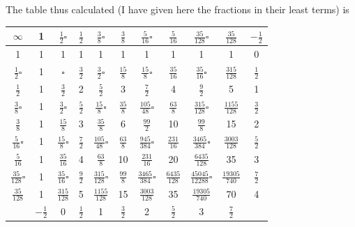 \documentclass[11pt,a4paper]{article}
\begin{document}
\smallskip
The table thus calculated (I have given here the fractions in their least terms) is

\begin{center}
\renewcommand{\arraystretch}{1.3}
\setlength{\tabcolsep}{4pt}
\begin{tabular}{|c|c|c|c|c|c|c|c|c|c|c|}
\hline
$\infty$ & 1 & $\tfrac{1}{2}\square$ & $\tfrac{1}{2}$ & $\tfrac{3}{8}\square$ & $\tfrac{3}{8}$ & $\tfrac{5}{16}\square$ & $\tfrac{5}{16}$ & $\tfrac{35}{128}\square$ & $\tfrac{35}{128}$ & $-\tfrac{1}{2}$\\
\hline
1 & 1 & 1 & 1 & 1 & 1 & 1 & 1 & 1 & 1 & 0\\
\hline
$\tfrac{1}{2}\square$ & 1 & $\square$ & $\tfrac{3}{2}$ & $\tfrac{3}{2}\square$ & $\tfrac{15}{8}$ & $\tfrac{15}{8}\square$ & $\tfrac{35}{16}$ & $\tfrac{35}{16}\square$ & $\tfrac{315}{128}$ & $\tfrac{1}{2}$\\
\hline
$\tfrac{1}{2}$ & 1 & $\tfrac{3}{2}$ & 2 & $\tfrac{5}{2}$ & 3 & $\tfrac{7}{2}$ & 4 & $\tfrac{9}{2}$ & 5 & 1\\
\hline
$\tfrac{3}{8}\square$ & 1 & $\tfrac{3}{2}\square$ & $\tfrac{5}{2}$ & $\tfrac{15}{8}\square$ & $\tfrac{35}{8}$ & $\tfrac{105}{48}\square$ & $\tfrac{63}{8}$ & $\tfrac{315}{128}\square$ & $\tfrac{1155}{128}$ & $\tfrac{3}{2}$\\
\hline
$\tfrac{3}{8}$ & 1 & $\tfrac{15}{8}$ & 3 & $\tfrac{35}{8}$ & 6 & $\tfrac{99}{2}$ & 10 & $\tfrac{99}{8}$ & 15 & 2\\
\hline
$\tfrac{5}{16}\square$ & 1 & $\tfrac{15}{8}\square$ & $\tfrac{7}{2}$ & $\tfrac{105}{48}\square$ & $\tfrac{63}{8}$ & $\tfrac{945}{384}\square$ & $\tfrac{231}{16}$ & $\tfrac{3465}{384}\square$ & $\tfrac{3003}{128}$ & $\tfrac{5}{2}$\\
\hline
$\tfrac{5}{16}$ & 1 & $\tfrac{35}{16}$ & 4 & $\tfrac{63}{8}$ & 10 & $\tfrac{231}{16}$ & 20 & $\tfrac{6435}{128}$ & 35 & 3\\
\hline
$\tfrac{35}{128}\square$ & 1 & $\tfrac{35}{16}\square$ & $\tfrac{9}{2}$ & $\tfrac{315}{128}\square$ & $\tfrac{99}{8}$ & $\tfrac{3465}{384}\square$ & $\tfrac{6435}{128}$ & $\tfrac{45045}{12288}\square$ & $\tfrac{19305}{740}$ & $\tfrac{7}{2}$\\
\hline
$\tfrac{35}{128}$ & 1 & $\tfrac{315}{128}$ & 5 & $\tfrac{1155}{128}$ & 15 & $\tfrac{3003}{128}$ & 35 & $\tfrac{19305}{740}$ & 70 & 4\\
\hline
 & $-\tfrac{1}{2}$ & 0 & $\tfrac{1}{2}$ & 1 & $\tfrac{3}{2}$ & 2 & $\tfrac{5}{2}$ & 3 & $\tfrac{7}{2}$ & \\
\hline
\end{tabular}
\end{center}
\end{document}
